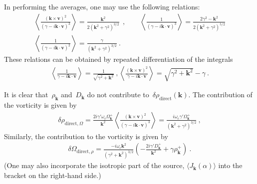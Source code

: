 \documentclass[preprint,aps,eqsecnum]{revtex4-1}
\newcommand{\fplus}[1]{{#1}^{+}}
\begin{document}
In performing the averages, one may use the following relations:
\begin{align}
  \left\langle
  \frac{({\bm k}\times{\bm v})^2}{(\gamma - i {\bm k}\cdot{\bm v})^3}
  \right\rangle =
  \frac{{\bm k}^2}{2\left({\bm k}^2 + \gamma^2\right)^{3/2}}\
  \ , 
  \qquad
  \left\langle                                                                
  \frac{1}{(\gamma - i {\bm k}\cdot{\bm v})^3}    
  \right\rangle = \frac{2\gamma^2 - {\bm k}^2}{
  2 \left({\bm k}^2 + \gamma^2\right)^{5/2}} \\
  \left\langle                                                                
  \frac{1}{(\gamma - i {\bm k}\cdot{\bm v})^2}    
  \right\rangle = \frac{\gamma}{
   \left({\bm k}^2 + \gamma^2\right)^{3/2}} \ . 
\end{align}
These relations can be obtained by repeated differentiation
of the integrals
\begin{align}
  \left\langle \frac{1}{\gamma - i {\bm k}\cdot{\bm v}} \right\rangle
  = \frac{1}{\sqrt{\gamma^2 + {\bm k}^2}}\ ,
  \left\langle \frac{({\bm k}\times{\bm v})^2}{
  \gamma - i {\bm k}\cdot{\bm v}} \right\rangle
  = \sqrt{\gamma^2 + {\bm k}^2} - \gamma \ .  
\end{align}


It is clear that~$\rho_{\bm k}$
and~$D_{\bm k}$ do not contribute to~$ \delta \rho_\mathrm{direct}({\bm k})$.
The contribution of the vorticity is given by
\begin{align}
  \delta \rho_{\mathrm{direct},\Omega}
  = \frac{2i\gamma' \omega_c\fplus{\Omega}_{\bm k}}{{\bm k}^2} \left\langle
  \frac{({\bm k}\times{\bm v})^2}{(\gamma - i {\bm k}\cdot{\bm v})^3}
  \right\rangle
  = \frac{i\omega_c \gamma'\fplus{\Omega}_{\bm k}}{
       \left({\bm k}^2 + \gamma^2\right)^{3/2}} \ , 
\end{align}
Similarly, the contribution to the vorticity is given by
\begin{align}
  \delta\Omega_{\mathrm{direct}, \rho} =
  \frac{-i \omega_c {\bm k}^2}{\left(\gamma^2 + {\bm k}^2\right)^{3/2}}
  \left( - \frac{2i\gamma' \fplus{D}_{\bm k}}{{\bm k}^2}
     + \gamma \fplus{\rho}_{\bm k}\right)\ . 
\end{align}
(One may also incorporate the isotropic part of the source,
$\langle J_{\bm k}(\alpha) \rangle$ into the bracket on the
right-hand side.)
\end{document}
